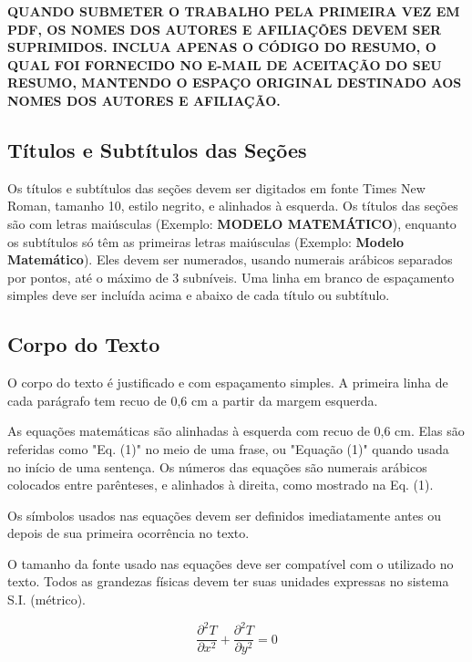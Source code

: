 \documentclass[10pt,fleqn,a4paper]{article}
\begin{document}
        \textbf{\textcolor[rgb]{1.00,0.00,0.00}{QUANDO SUBMETER O TRABALHO PELA PRIMEIRA VEZ EM PDF, OS NOMES DOS AUTORES E AFILIAÇÕES DEVEM SER SUPRIMIDOS. INCLUA APENAS O CÓDIGO DO RESUMO, O QUAL FOI FORNECIDO NO E-MAIL DE ACEITAÇÃO DO SEU RESUMO, MANTENDO O ESPAÇO ORIGINAL DESTINADO AOS NOMES DOS AUTORES E AFILIAÇÃO.}}


    \subsection{Títulos e Subtítulos das Seções }

        Os títulos e subtítulos das seções devem ser digitados em fonte Times New Roman, tamanho 10, estilo negrito, e alinhados à esquerda. Os títulos das seções são com letras maiúsculas (Exemplo: \textbf{MODELO MATEMÁTICO}), enquanto os subtítulos só têm as primeiras letras maiúsculas (Exemplo: \textbf{Modelo Matemático}). Eles devem ser numerados, usando numerais arábicos separados por pontos, até o máximo de 3 subníveis. Uma linha em branco de espaçamento simples deve ser incluída acima e abaixo de cada título ou subtítulo.

    \subsection{Corpo do Texto}

        O corpo do texto é justificado e com espaçamento simples. A primeira linha de cada parágrafo tem recuo de 0,6 cm a partir da margem esquerda.

        As equações matemáticas são alinhadas à esquerda com recuo de 0,6 cm.  Elas são referidas como "Eq. (1)" no meio de uma frase, ou "Equação (1)" quando usada no início de uma sentença. Os números das equações são numerais arábicos colocados entre parênteses, e alinhados à direita, como mostrado na Eq. (1).

        Os símbolos usados nas equações devem ser definidos imediatamente antes ou depois de sua primeira ocorrência no texto. \citep{artigoMangaSBAI}

        O tamanho da fonte usado nas equações deve ser compatível com o utilizado no texto. Todos as grandezas físicas devem ter suas unidades expressas no sistema S.I. (métrico).

        \begin{equation}
        \frac{\partial^2 T}{\partial x^2} + \frac{\partial^2 T}{\partial y^2} = 0 \label{equation1}
        \end{equation}
\end{document}
